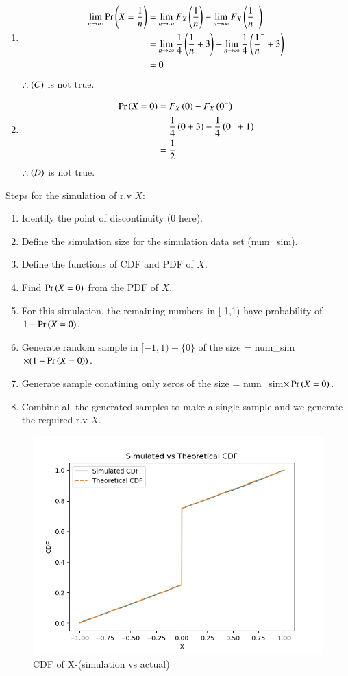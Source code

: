 \documentclass[journal,12pt,twocolumn]{IEEEtran}
\theoremstyle{remark}
\begin{document}
\begin{enumerate}[label=(\Alph*)]
    \item \begin{align}
    		\lim_{n \to \infty} \Pr\left(X = \frac{1}{n}\right) &= \lim_{n \to \infty}F_X\left(\frac{1}{n}\right) - \lim_{n \to \infty}F_X\left(\frac{1}{n}^-\right)\\
    		&= \lim_{n \to \infty}\frac{1}{4}\left(\frac{1}{n}+3\right) - \lim_{n \to \infty}\frac{1}{4}\left(\frac{1}{n}^-+3\right)\\
    		&= 0
    	\end{align}
    	$\therefore \left(C\right)$ is not true.
    	
    	\item \begin{align}
    		\Pr\left(X = 0\right) &= F_X\left(0\right) - F_X\left(0^-\right)\\
    		&= \frac{1}{4}\left(0+3\right) - \frac{1}{4}\left(0^-+1\right)\\
    		&= \frac{1}{2}
    	\end{align}
    	$\therefore \left(D\right)$ is not true.
\end{enumerate}
Steps for the simulation of r.v $X$:
\begin{enumerate}
	\item Identify the point of discontinuity (0 here).
	\item Define the simulation size for the simulation data set (num\_sim).
	\item Define the functions of CDF and PDF of $X$.
	\item Find $\Pr\left(X=0\right)$ from the PDF of $X$.
	\item For this simulation, the remaining numbers in [-1,1) have probability of $1 - \Pr\left(X=0\right)$.
	\item Generate random sample in $[-1,1) - \{0\}$ of the size = num\_sim$\times(1 - \Pr\left(X=0\right))$.
	\item Generate sample conatining only zeros of the size = num\_sim$\times\Pr\left(X=0\right)$.
	\item Combine all the generated samples to make a single sample and we generate the required r.v $X$.
\end{enumerate}
\newpage
\begin{figure}
\includegraphics[width=\columnwidth]{./figs/main.png}
\caption{CDF of X-(simulation vs actual)}
\label{fig:theo_vs_sim(X)}
\end{figure}
\end{document}
